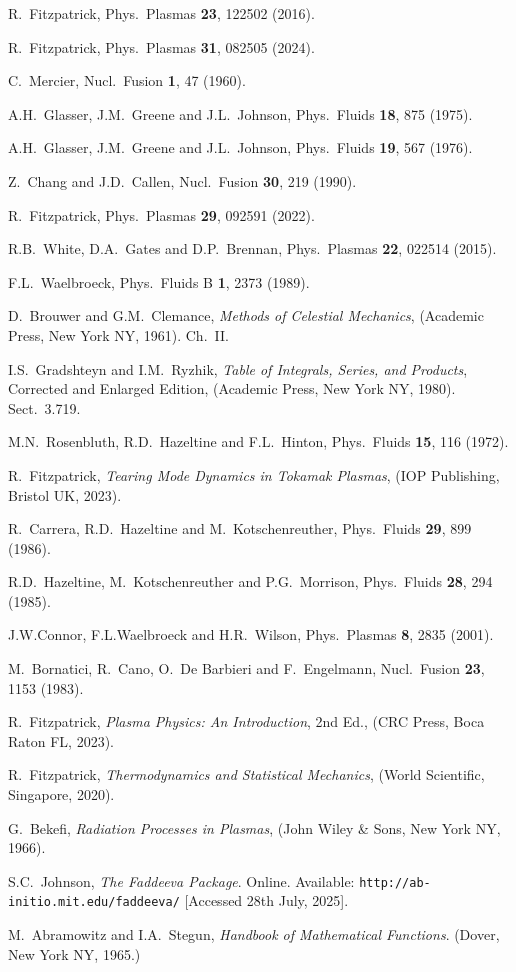 \documentclass{iopjournal}
\begin{document}
\begin{thebibliography}{99}
 R.~Fitzpatrick, Phys.\ Plasmas {\bf 23}, 122502 (2016).

 R.~Fitzpatrick, Phys.\ Plasmas {\bf 31}, 082505 (2024).

 C.~Mercier, Nucl.\ Fusion {\bf 1}, 47 (1960).

 A.H.~Glasser, J.M.~Greene and J.L.~Johnson, Phys.\ Fluids {\bf 18}, 875 (1975).

 A.H.~Glasser, J.M.~Greene  and J.L.~Johnson, Phys.\ Fluids {\bf 19}, 567 (1976).

 Z.~Chang and J.D.~Callen,  Nucl.\ Fusion {\bf 30}, 219 (1990).

 R.~Fitzpatrick, Phys.\ Plasmas {\bf 29}, 092591 (2022).

 R.B.~White, D.A.~Gates and D.P.~Brennan, Phys.\ Plasmas {\bf 22}, 022514 (2015). 

 F.L.~Waelbroeck, Phys.\ Fluids B {\bf 1}, 2373 (1989).

 D.~Brouwer and G.M.~Clemance, {\em Methods of Celestial Mechanics}, (Academic Press, New York NY, 1961).  Ch.~II.

 I.S.~Gradshteyn and I.M.~Ryzhik, {\em Table of Integrals, Series, and Products}, Corrected and Enlarged Edition, (Academic Press, New York NY, 1980). Sect.~3.719.

 M.N.~Rosenbluth, R.D.~Hazeltine and F.L.~Hinton, Phys.\ Fluids {\bf 15}, 116 (1972).

 R.~Fitzpatrick, {\em Tearing Mode Dynamics in Tokamak Plasmas}, (IOP Publishing, Bristol UK, 2023).

 R.~Carrera, R.D.~Hazeltine and M.~Kotschenreuther, Phys.\ Fluids {\bf 29}, 899 (1986). 

 R.D.~Hazeltine, M.~Kotschenreuther and P.G.~Morrison, Phys.\ Fluids {\bf 28}, 294 (1985). 

 J.W.Connor,  F.L.Waelbroeck and  H.R.~Wilson, Phys.\ Plasmas {\bf 8}, 2835 (2001). 

 M.~Bornatici, R.~Cano, O.\ De Barbieri and F.~Engelmann, Nucl.\ Fusion {\bf 23}, 1153 (1983).

 R.~Fitzpatrick, {\em Plasma Physics: An Introduction}, 2nd Ed., (CRC Press, Boca Raton FL, 2023).

 R.~Fitzpatrick, {\em Thermodynamics and Statistical Mechanics}, (World Scientific, Singapore,  2020).

 G.~Bekefi, {\em Radiation Processes in Plasmas}, (John Wiley \& Sons, New York NY, 1966).

 S.C.~Johnson, {\em The Faddeeva Package}. Online. Available: {\tt http://ab-initio.mit.edu/faddeeva/} [Accessed 28th July, 2025].

 M.~Abramowitz and I.A.~Stegun, {\em Handbook of Mathematical Functions}. (Dover, New York NY, 1965.)

\end{thebibliography}
\end{document}
